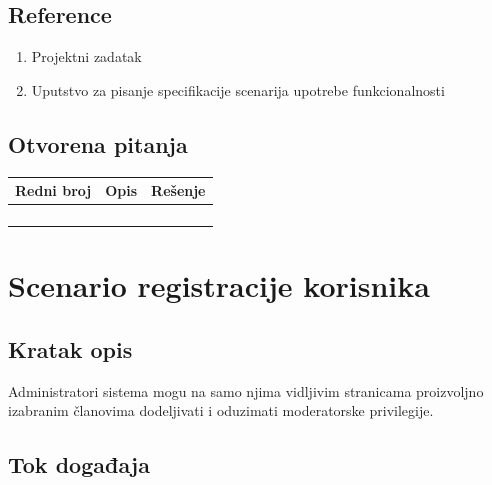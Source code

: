 \documentclass[11pt,a4paper]{article}
\begin{document}
\subsection{Reference}
\begin{enumerate}
    \item Projektni zadatak
    \item Uputstvo za pisanje specifikacije scenarija upotrebe funkcionalnosti
\end{enumerate}
\subsection{Otvorena pitanja}
\begin{center}
\begin{tabular}{| >{\centering\arraybackslash}m{1.9cm} | >{\centering\arraybackslash}m{4.9cm} | >{\centering\arraybackslash}m{4.9cm} |}
\hline
\rowcolor[HTML]{000000} 
{\color[HTML]{FFFFFF} Redni broj } & {\color[HTML]{FFFFFF} Opis } & {\color[HTML]{FFFFFF} Rešenje } \\ \hline
 &  &  \\ \hline
 &  &  \\ \hline
 &  &  \\ \hline
 &  &  \\ \hline
\end{tabular}
\end{center}

\newpage

\section{Scenario registracije korisnika}
\subsection{Kratak opis}
Administratori sistema mogu na samo njima vidljivim stranicama proizvoljno izabranim članovima dodeljivati i oduzimati moderatorske privilegije.
\subsection{Tok događaja}
\end{document}
